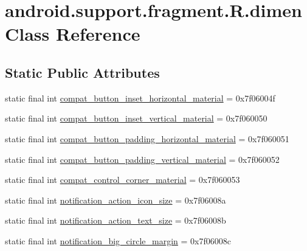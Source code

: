 \hypertarget{classandroid_1_1support_1_1fragment_1_1R_1_1dimen}{}\section{android.\+support.\+fragment.\+R.\+dimen Class Reference}
\label{classandroid_1_1support_1_1fragment_1_1R_1_1dimen}
\subsection*{Static Public Attributes}
\begin{DoxyCompactItemize}
\item 
static final int \mbox{\hyperlink{classandroid_1_1support_1_1fragment_1_1R_1_1dimen_a377682e42827cffeaa800d71d75f4fd0}{compat\+\_\+button\+\_\+inset\+\_\+horizontal\+\_\+material}} = 0x7f06004f
\item 
static final int \mbox{\hyperlink{classandroid_1_1support_1_1fragment_1_1R_1_1dimen_a343ee5497a2795bac9976fd290494dbb}{compat\+\_\+button\+\_\+inset\+\_\+vertical\+\_\+material}} = 0x7f060050
\item 
static final int \mbox{\hyperlink{classandroid_1_1support_1_1fragment_1_1R_1_1dimen_a474f66a8026c551de98f9c0c43a78c02}{compat\+\_\+button\+\_\+padding\+\_\+horizontal\+\_\+material}} = 0x7f060051
\item 
static final int \mbox{\hyperlink{classandroid_1_1support_1_1fragment_1_1R_1_1dimen_ae24f606372e9e42f86c05246ddb18045}{compat\+\_\+button\+\_\+padding\+\_\+vertical\+\_\+material}} = 0x7f060052
\item 
static final int \mbox{\hyperlink{classandroid_1_1support_1_1fragment_1_1R_1_1dimen_afced0a78ae01108e8b4d96cb05cfd84b}{compat\+\_\+control\+\_\+corner\+\_\+material}} = 0x7f060053
\item 
static final int \mbox{\hyperlink{classandroid_1_1support_1_1fragment_1_1R_1_1dimen_adf98f7aff4a04bb3a512866e72217c5f}{notification\+\_\+action\+\_\+icon\+\_\+size}} = 0x7f06008a
\item 
static final int \mbox{\hyperlink{classandroid_1_1support_1_1fragment_1_1R_1_1dimen_aa631976a40f5458a09b8bdc988c674d6}{notification\+\_\+action\+\_\+text\+\_\+size}} = 0x7f06008b
\item 
static final int \mbox{\hyperlink{classandroid_1_1support_1_1fragment_1_1R_1_1dimen_a674b65742ac413519bb0cb7885d21ac4}{notification\+\_\+big\+\_\+circle\+\_\+margin}} = 0x7f06008c
\item 

\end{DoxyCompactItemize}
